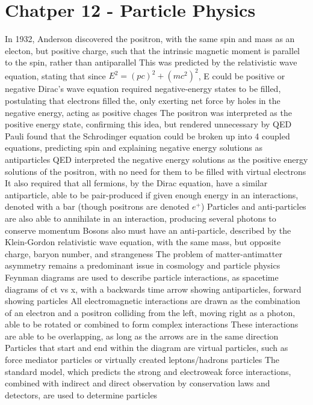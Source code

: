 \documentclass[11 pt, twoside]{article}
\newenvironment{outline*}
{
	\begin{outline}[enumerate]
	}
	{\end{outline}
}
\begin{document}
\section{Chatper 12 - Particle Physics}
\begin{outline*}
\1 In 1932, Anderson discovered the positron, with the same spin and mass as an electon, but positive charge, such that the intrinsic magnetic moment is parallel to the spin, rather than antiparallel
	\2 This was predicted by the relativistic wave equation, stating that since $E^2 = (pc)^2 + (mc^2)^2$, E could be positive or negative
		\3 Dirac's wave equation required negative-energy states to  be filled, postulating that electrons filled the, only exerting net force by holes in the negative energy, acting as positive chages
		\3 The positron was interpreted as the positive energy state, confirming this idea, but rendered unnecessary by QED
	\2 Pauli found that the Schrodinger equation could be broken up into 4 coupled equations, predicting spin and explaining negative energy solutions as antiparticles
	\2 QED interpreted the negative energy solutions as the positive energy solutions of the positron, with no need for them to be filled with virtual electrons
		\3 It also required that all fermions, by the Dirac equation, have a similar antiparticle, able to be pair-produced if given enough energy in an interactions, denoted with a bar (though positrons are denoted $e^+$)
			\4 Particles and anti-particles are also able to annihilate in an interaction, producing several photons to conserve momentum
		\3 Bosons also must have an anti-particle, described by the Klein-Gordon relativistic wave equation, with the same mass, but opposite charge, baryon number, and strangeness
	\2 The problem of matter-antimatter asymmetry remains a predominant issue in cosmology and particle physics
	\2 Feynman diagrams are used to describe particle interactions, as spacetime diagrams of ct vs x, with a backwards time arrow showing antiparticles, forward showing particles
		\3 All electromagnetic interactions are drawn as the combination of an electron and a positron colliding from the left, moving right as a photon, able to be rotated or combined to form complex interactions
			\4 These interactions are able to be overlapping, as long as the arrows are in the same direction
		\3 Particles that start and end within the diagram are virtual particles, such as force mediator particles or virtually created leptons/hadrons particles
	\2 The standard model, which predicts the strong and electroweak force interactions, combined with indirect and direct observation by conservation laws and detectors, are used to determine particles

\end{outline*}
\end{document}
